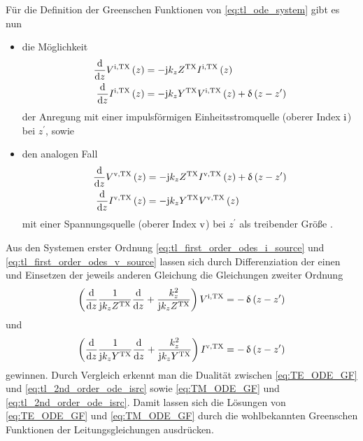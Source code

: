 Für die Definition der Greenschen Funktionen von \eqref{eq:tl_ode_system} gibt es nun
\begin{itemize}
	\item die Möglichkeit
	\begin{subequations}\label{eq:tl_first_order_odes_i_source}
		\begin{align}
			\frac{\mathrm{d}}{\mathrm{d} z} V^{\mathrm{i},\mathrm{TX}}\left(z\right) &= -\mathrm{j} k_z Z^{\mathrm{TX}} I^{\mathrm{i},\mathrm{TX}}\left(z\right) \label{eq:tl_first_order_odes_i_source_homo}\\
			\frac{\mathrm{d}}{\mathrm{d} z} I^{\mathrm{i},\mathrm{TX}}\left(z\right) &=-\mathrm{j} k_z Y^{\mathrm{TX}} V^{\mathrm{i},\mathrm{TX}}\left(z\right) + \operatorname{\updelta}\left(z-z^\prime\right)
		\end{align}
	\end{subequations}
	der Anregung mit einer impulsförmigen Einheitsstromquelle (oberer Index $\mathrm{i}$) bei $z^\prime$, sowie 
	\item den analogen Fall
	\begin{subequations}\label{eq:tl_first_order_odes_v_source}
		\begin{align}
			\frac{\mathrm{d}}{\mathrm{d} z} V^{\mathrm{v},\mathrm{TX}}\left(z\right) &= -\mathrm{j} k_z Z^{\mathrm{TX}} I^{\mathrm{v},\mathrm{TX}}\left(z\right) + \operatorname{\updelta}\left(z-z^\prime\right) \\
			\frac{\mathrm{d}}{\mathrm{d} z} I^{\mathrm{v},\mathrm{TX}}\left(z\right) &=-\mathrm{j} k_z Y^{\mathrm{TX}} V^{\mathrm{v},\mathrm{TX}}\left(z\right) \label{eq:tl_first_order_odes_v_source_homo}
		\end{align}
	\end{subequations}
	 mit einer Spannungsquelle (oberer Index $\mathrm{v}$) bei $z^\prime$ als treibender Größe \cite{Michalski2016b}.
\end{itemize}
Aus den Systemen erster Ordnung \eqref{eq:tl_first_order_odes_i_source} und \eqref{eq:tl_first_order_odes_v_source} lassen sich durch Differenziation der einen und Einsetzen der jeweils anderen Gleichung die Gleichungen zweiter Ordnung
\begin{equation}\label{eq:tl_2nd_order_ode_isrc}
	\left(\frac{\mathrm{d}}{\mathrm{d} z} \frac{1}{\mathrm{j} k_z Z^{\mathrm{TX}}} \frac{\mathrm{d}}{\mathrm{d} z} + \frac{k_z^2}{\mathrm{j} k_z Z^{\mathrm{TX}}}\right)  V^{\mathrm{i},\mathrm{TX}} = -\operatorname{\updelta}\left(z-z^\prime\right)
\end{equation}
und
\begin{equation}\label{eq:tl_2nd_order_ode_vsrc}
	\left(\frac{\mathrm{d}}{\mathrm{d} z} \frac{1}{\mathrm{j} k_z Y^{\mathrm{TX}}} \frac{\mathrm{d}}{\mathrm{d} z} + \frac{k_z^2}{\mathrm{j} k_z Y^{\mathrm{TX}}}\right)  I^{\mathrm{v},\mathrm{TX}} = -\operatorname{\updelta}\left(z-z^\prime\right)
\end{equation}
gewinnen. Durch Vergleich erkennt man die Dualität zwischen \eqref{eq:TE_ODE_GF} und \eqref{eq:tl_2nd_order_ode_isrc} sowie \eqref{eq:TM_ODE_GF} und \eqref{eq:tl_2nd_order_ode_isrc}. Damit lassen sich die Lösungen von \eqref{eq:TE_ODE_GF} und \eqref{eq:TM_ODE_GF} durch die wohlbekannten Greenschen Funktionen der Leitungsgleichungen ausdrücken.


